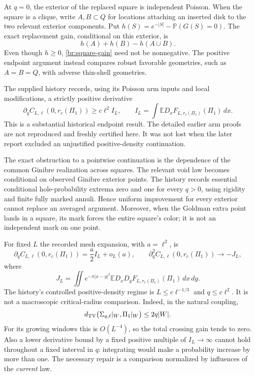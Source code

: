 \documentclass[11pt,a4paper]{article}
\theoremstyle{definition}
\theoremstyle{remark}
\numberwithin{equation}{section}
\begin{document}
At $q=0$, the exterior of the replaced square is independent Poisson.
When the square is a clique, write $A,B\subset Q$ for locations
attaching an inserted disk to the two relevant exterior components.  Put
$h(S)=e^{-|S|}-\mathbb P(G(S)=0)$.  The exact replacement gain,
conditional on this exterior, is
\begin{equation}
 h(A)+h(B)-h(A\cup B).
 \label{br:square-gain}
\end{equation}
Even though $h\geq0$, \eqref{br:square-gain} need not be nonnegative.
The positive endpoint argument instead compares robust favorable
geometries, such as $A=B=Q$, with adverse thin-shell geometries.

The supplied history records, using its Poisson arm inputs and local
modifications, a strictly positive derivative
\[
 \partial_q C_{L,\ell}(0,r_c(\Pi_1))
 \geq c\ell^2 I_L,
 \qquad
 I_L=\int\mathbb ED_xF_{L,r_c(\Pi_1)}(\Pi_1)\,dx.
\]
This is a substantial historical endpoint result.  The detailed earlier
arm proofs are not reproduced and freshly certified here.  It was not
lost when the later report excluded an unjustified positive-density
continuation.

The exact obstruction to a pointwise continuation is the dependence of
the common Ginibre realization across squares.  The relevant void law
becomes conditional on observed Ginibre exterior points.  The history
records essential conditional hole-probability extrema zero and one for
every $q>0$, using rigidity and finite fully marked annuli.  Hence uniform
improvement for every exterior cannot replace an averaged argument.
Moreover, when the Goldman extra point lands in a square, its mark forces
the entire square's color; it is not an independent mark on one point.

For fixed $L$ the recorded mesh expansion, with $a=\ell^2$, is
\[
 \partial_q C_{L,\ell}(0,r_c(\Pi_1))
       =\frac a2I_L+o_L(a),
 \qquad
 \partial_q^2 C_{L,\ell}(0,r_c(\Pi_1))\longrightarrow-J_L,
\]
where
\[
 J_L=\iint e^{-\pi|x-y|^2}
                \mathbb ED_xD_yF_{L,r_c(\Pi_1)}(\Pi_1)\,dx\,dy.
\]
The history's controlled positive-density regime is
$L\leq c\ell^{-1/3}$ and $q\leq c\ell^2$.  It is not a macroscopic
critical-radius comparison.  Indeed, in the natural coupling,
\[
 d_{\rm TV}\bigl(\Sigma_{q,\ell}|_W,\Pi_1|_W\bigr)
 \leq2q|W|.
\]
For its growing windows this is $O(L^{-4})$, so the total crossing gain
tends to zero.  Also a lower derivative bound by a fixed positive
multiple of $I_L\to\infty$ cannot hold throughout a fixed interval in
$q$: integrating would make a probability increase by more than one.
The necessary repair is a comparison normalized by influences of the
\emph{current} law.
\end{document}
